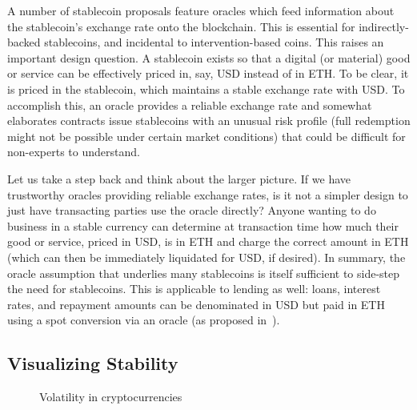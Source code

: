 A number of stablecoin proposals feature oracles which feed information about the stablecoin's exchange rate onto the blockchain. This is essential for indirectly-backed stablecoins, and incidental to intervention-based coins. This raises an important design question. A stablecoin exists so that a digital (or material) good or service can be effectively priced in, say, USD instead of in ETH. To be clear, it is priced in the stablecoin, which maintains a stable exchange rate with USD. To accomplish this, an oracle provides a reliable exchange rate and somewhat elaborates contracts issue stablecoins with an unusual risk profile (\eg full redemption might not be possible under certain market conditions) that could be difficult for non-experts to understand.

Let us take a step back and think about the larger picture. If we have trustworthy oracles providing reliable exchange rates, is it not a simpler design to just have transacting parties use the oracle directly? Anyone wanting to do business in a stable currency can determine at transaction time how much their good or service, priced in USD, is in ETH and charge the correct amount in ETH (which can then be immediately liquidated for USD, if desired). In summary, the oracle assumption that underlies many stablecoins is itself sufficient to side-step the need for stablecoins. This is applicable to lending as well: loans, interest rates, and repayment amounts can be denominated in USD but paid in ETH using a spot conversion via an oracle (\eg as proposed in~\cite{okoyetoward}).


\subsection{Visualizing Stability}\label{sec:stability}

\begin{figure}[t!]
	\centering
	\hfill
	\caption{Volatility in cryptocurrencies}
	\label{fig:fiatandcrypto}
\end{figure}

